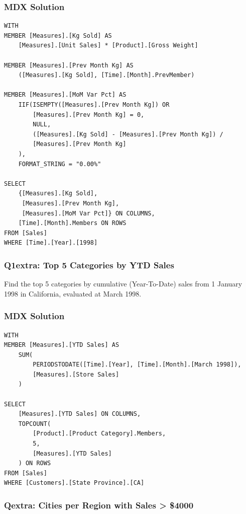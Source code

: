 \subsubsection*{MDX Solution}
\begin{lstlisting}[language=MDX]
WITH
MEMBER [Measures].[Kg Sold] AS
    [Measures].[Unit Sales] * [Product].[Gross Weight]

MEMBER [Measures].[Prev Month Kg] AS
    ([Measures].[Kg Sold], [Time].[Month].PrevMember)

MEMBER [Measures].[MoM Var Pct] AS
    IIF(ISEMPTY([Measures].[Prev Month Kg]) OR
        [Measures].[Prev Month Kg] = 0,
        NULL,
        ([Measures].[Kg Sold] - [Measures].[Prev Month Kg]) /
        [Measures].[Prev Month Kg]
    ),
    FORMAT_STRING = "0.00%"

SELECT
    {[Measures].[Kg Sold],
     [Measures].[Prev Month Kg],
     [Measures].[MoM Var Pct]} ON COLUMNS,
    [Time].[Month].Members ON ROWS
FROM [Sales]
WHERE [Time].[Year].[1998]
\end{lstlisting}

\subsubsection{Q1extra: Top 5 Categories by YTD Sales}
\label{subsec:ex-q1extra}

\begin{theorybox}[frametitle={Exercise}]
Find the top 5 categories by cumulative (Year-To-Date) sales from 1 January 1998 in California, evaluated at March 1998.
\end{theorybox}

\subsubsection*{MDX Solution}
\begin{lstlisting}[language=MDX]
WITH
MEMBER [Measures].[YTD Sales] AS
    SUM(
        PERIODSTODATE([Time].[Year], [Time].[Month].[March 1998]),
        [Measures].[Store Sales]
    )

SELECT
    [Measures].[YTD Sales] ON COLUMNS,
    TOPCOUNT(
        [Product].[Product Category].Members,
        5,
        [Measures].[YTD Sales]
    ) ON ROWS
FROM [Sales]
WHERE [Customers].[State Province].[CA]
\end{lstlisting}

\subsubsection{Qextra: Cities per Region with Sales > \$4000}
\label{subsec:ex-qextra}

